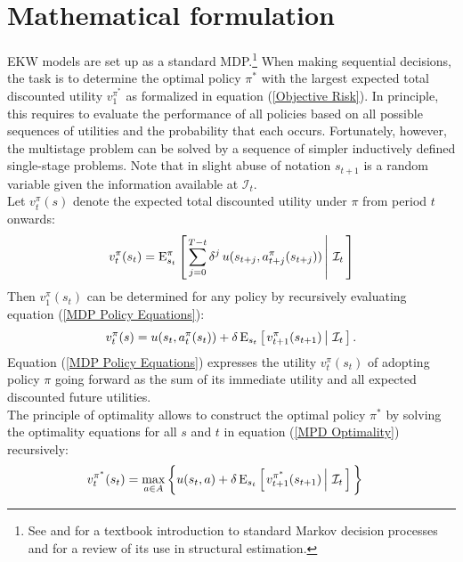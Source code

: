 \section{Mathematical formulation}\label{Mathematics}
EKW models are set up as a standard MDP.\footnote{See \citet{Puterman.1994} and \citet{White.1993} for a textbook introduction to standard Markov decision processes and \citet{Rust.1994} for a review of its use in structural estimation.} When making sequential decisions, the task is to determine the optimal policy $\pi^*$ with the largest expected total discounted utility $v^{\pi^*}_1$ as formalized in equation (\ref{Objective Risk}). In principle, this requires to evaluate the performance of all policies based on all possible sequences of utilities and the probability that each occurs. Fortunately, however, the multistage problem can be solved by a sequence of simpler inductively defined single-stage problems. Note that in slight abuse of notation $s_{t + 1}$ is a random variable given the information available at $\mathcal{I}_t$.\\

Let $v^\pi_t(s)$ denote the expected total discounted utility under $\pi$ from period $t$ onwards:
%
\begin{align*}
  v^\pi_t(s_t) = \mathrm{E}_{s_t}^\pi\left[\left.\sum^{T - t}_{j = 0}  \delta^j\, u(s_{t + j}, a^\pi_{t + j}(s_{t + j})) \,\right\vert\,\mathcal{I}_t\,\right]
\end{align*}
%
Then $v_1^\pi(s_t)$ can be determined for any policy by recursively evaluating equation (\ref{MDP Policy Equations}):
%
\begin{align}\label{MDP Policy Equations}
v^\pi_t(s) = u(s_t,  a^\pi_t(s_t)) + \delta\,\mathrm{E}_{s_t} \left[\left.v^\pi_{t + 1}(s_{t + 1})  \,\right\vert\,\mathcal{I}_t\,\right].
\end{align}
%
Equation (\ref{MDP Policy Equations}) expresses the utility $v^\pi_t(s_t)$ of adopting policy $\pi$ going forward as the sum of its immediate utility and all expected discounted future utilities.\\

The principle of optimality \citep{Bellman.1957, Puterman.1994} allows to construct the optimal policy $\pi^*$ by solving the optimality equations for all $s$ and $t$ in equation (\ref{MPD Optimality}) recursively:
%
\begin{align}\label{MPD Optimality}
v^{\pi^*}_t(s_t)  & = \max_{a \in A}\bigg\{ u(s_t, a) + \delta\, \mathrm{E}_{s_t} \left[\left.v^{\pi^*}_{t + 1}(s_{t + 1})\,\right\vert\,\mathcal{I}_t\,\right] \bigg\}
\end{align}

